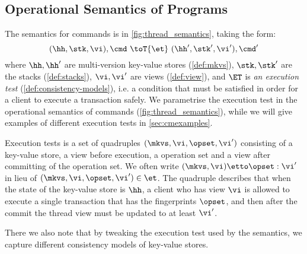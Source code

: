 \subsection{Operational Semantics of Programs}
\label{sec:prog-semantics}

The semantics for commands is in \cref{fig:thread_semantics}, taking the form:
\[
    ( \hh, \stk, \vi ), \cmd \ \toT{\et} \ ( \hh', \stk', \vi' ) , \cmd'
\]
where \( \hh, \hh' \) are multi-version key-value stores (\cref{def:mkvs}), \( \stk, \stk'\) are the stacks (\cref{def:stacks}), \( \vi, \vi'\) are views (\cref{def:view}), and $\ET$ is \emph{an execution test} (\cref{def:consistency-models}), i.e. a condition that must be satisfied in order for a client to execute a transaction safely. 
We parametrise the execution test in the operational semantics of commands (\cref{fig:thread_semantics}), while we will give examples of different execution tests in \cref{sec:cmexamples}. 

Execution tests is a set of quadruples \( (\mkvs, \vi, \opset, \vi') \) consisting of a key-value store, a view before execution, a operation set and a view after committing of the operation set. 
We often write \( (\mkvs, \vi) \etto \opset : \vi'\) in lieu of \( (\mkvs, \vi, \opset, \vi') \in \et\).
The quadruple describes that when the state of the key-value store is \( \hh \), a client who has view \( \vi \) is allowed to execute a single transaction that has  the fingerprints \( \opset \), and then after the commit the thread view must be updated to at least \( \vi' \).

\ac{
There we also note that by tweaking the execution test used by the 
semantics, we capture different consistency models of 
key-value stores.
}


